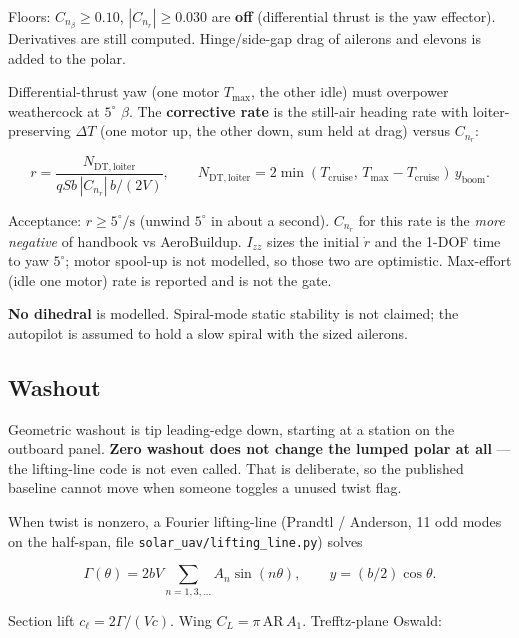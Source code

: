 \documentclass[11pt,letterpaper]{article}
\newcommand{\code}[1]{\texttt{#1}}
\begin{document}
Floors: $C_{n_\beta}\ge 0.10$, $|C_{n_r}|\ge 0.030$ are \textbf{off} (differential thrust is the yaw effector). Derivatives are still computed. Hinge/side-gap drag of ailerons and elevons is added to the polar.

Differential-thrust yaw (one motor $T_{\max}$, the other idle) must overpower weathercock at $5^\circ$ $\beta$. The \textbf{corrective rate} is the still-air heading rate with loiter-preserving $\Delta T$ (one motor up, the other down, sum held at drag) versus $C_{n_r}$:

\begin{equation}
  r = \frac{N_{\mathrm{DT,loiter}}}{q S b\, |C_{n_r}|\, b/(2V)},
  \qquad
  N_{\mathrm{DT,loiter}} = 2\min(T_{\mathrm{cruise}},\, T_{\max}-T_{\mathrm{cruise}})\, y_{\mathrm{boom}}.
\end{equation}

Acceptance: $r \ge 5^\circ/\mathrm{s}$ (unwind $5^\circ$ in about a second). $C_{n_r}$ for this rate is the \emph{more negative} of handbook vs AeroBuildup. $I_{zz}$ sizes the initial $\dot r$ and the 1-DOF time to yaw $5^\circ$; motor spool-up is not modelled, so those two are optimistic. Max-effort (idle one motor) rate is reported and is not the gate.

\textbf{No dihedral} is modelled. Spiral-mode static stability is not claimed; the autopilot is assumed to hold a slow spiral with the sized ailerons.

\subsection{Washout}
\label{sec:washout}

Geometric washout is tip leading-edge down, starting at a station on the outboard panel. \textbf{Zero washout does not change the lumped polar at all} --- the lifting-line code is not even called. That is deliberate, so the published baseline cannot move when someone toggles a unused twist flag.

When twist is nonzero, a Fourier lifting-line (Prandtl / Anderson, 11 odd modes on the half-span, file \code{solar\_uav/lifting\_line.py}) solves

\begin{equation}
  \Gamma(\theta) = 2 b V \sum_{n=1,3,\ldots} A_n \sin(n\theta),
  \qquad y = (b/2)\cos\theta.
\end{equation}

Section lift $c_\ell = 2\Gamma /(V c)$. Wing $C_L = \pi\,\mathrm{AR}\, A_1$. Trefftz-plane Oswald:
\end{document}
